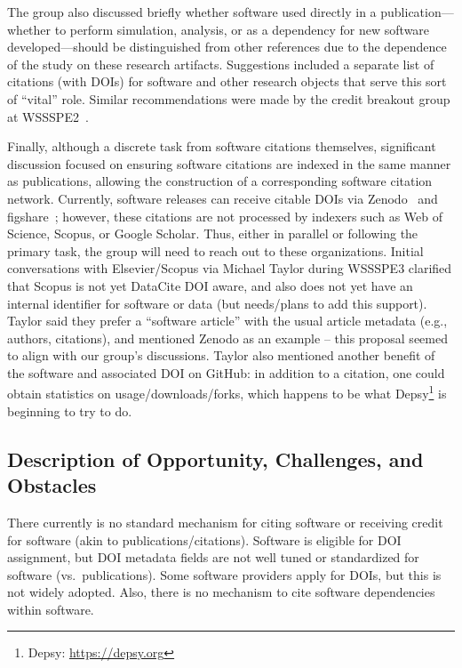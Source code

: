 The group also discussed briefly whether software used directly in a
publication---whether to perform simulation, analysis, or as a dependency for
new software developed---should be distinguished from other references due to
the dependence of the study on these research artifacts. Suggestions included a
separate list of citations (with DOIs) for software and other research objects
that serve this sort of ``vital'' role. Similar recommendations were made by the
credit breakout group at WSSSPE2~\cite{WSSSPE2}.

Finally, although a discrete task from software citations themselves,
significant discussion focused on ensuring software citations are indexed in the
same manner as publications, allowing the construction of a corresponding
software citation network. Currently, software releases can receive citable DOIs
via Zenodo~\cite{zenodo-web} and figshare~\cite{figshare-web}; however, these
citations are not processed by indexers such as Web of Science, Scopus, or
Google Scholar. Thus, either in parallel or following the primary task, the
group will need to reach out to these organizations. Initial conversations with
Elsevier\slash Scopus via Michael Taylor during WSSSPE3 clarified that Scopus
is not yet DataCite DOI aware, and also does not yet have an internal identifier
for software or data (but needs\slash plans to add this support). Taylor said
they prefer a ``software article'' with the usual article metadata (e.g.,
authors, citations), and mentioned Zenodo as an example -- this proposal seemed
to align with our group's discussions. Taylor also mentioned another benefit of the
software and associated DOI on GitHub: in addition to a citation, one could obtain
statistics on usage/downloads/forks, which happens to be what
Depsy\footnote{Depsy: \url{https://depsy.org}} is beginning to try to do.

\subsection{Description of Opportunity, Challenges, and Obstacles}

There currently is no standard mechanism for citing software or
receiving credit for software (akin to publications/citations). Software is
eligible for DOI assignment, but DOI metadata fields are not well tuned or
standardized for software (vs.\ publications). Some software providers apply for
DOIs, but this is not widely adopted. Also, there is no mechanism to cite
software dependencies within software.

